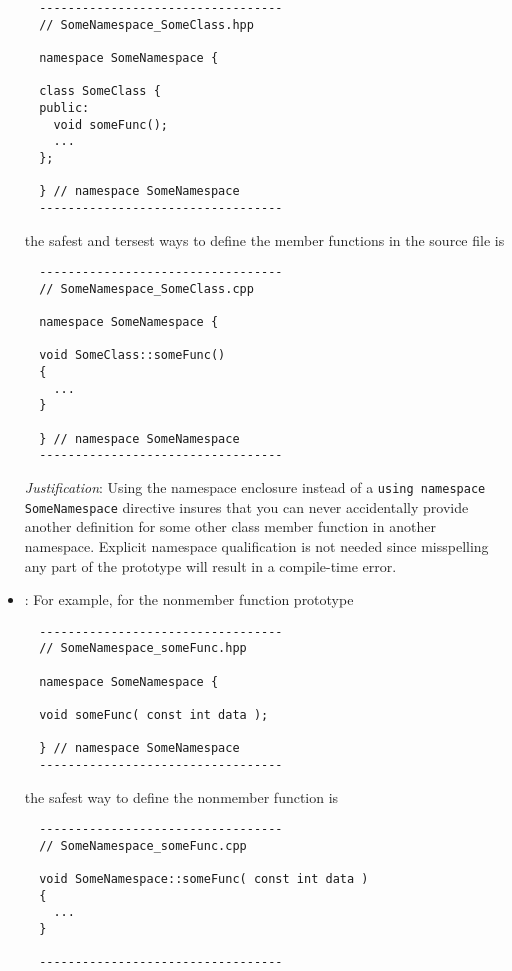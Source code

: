 \begin{itemize}
{\small\begin{verbatim}
  ----------------------------------
  // SomeNamespace_SomeClass.hpp

  namespace SomeNamespace {

  class SomeClass {
  public:
    void someFunc();
    ...
  };

  } // namespace SomeNamespace
  ----------------------------------
\end{verbatim}}

the safest and tersest ways to define the member functions in the
source file is

{\small\begin{verbatim}
  ----------------------------------
  // SomeNamespace_SomeClass.cpp

  namespace SomeNamespace {

  void SomeClass::someFunc()
  {
    ...
  }

  } // namespace SomeNamespace
  ----------------------------------
\end{verbatim}}

\textit{Justification}: Using the namespace enclosure instead of a
\texttt{using namespace SomeNamespace} directive insures that you can
never accidentally provide another definition for some other class
member function in another namespace.  Explicit namespace
qualification is not needed since misspelling any part of the
prototype will result in a compile-time error.


\item\GCGNamespaceFuncDefs: For example, for the nonmember function
  prototype

{\small\begin{verbatim}
  ----------------------------------
  // SomeNamespace_someFunc.hpp

  namespace SomeNamespace {

  void someFunc( const int data );

  } // namespace SomeNamespace
  ----------------------------------
\end{verbatim}}

the safest way to define the nonmember function is

{\small\begin{verbatim}
  ----------------------------------
  // SomeNamespace_someFunc.cpp

  void SomeNamespace::someFunc( const int data )
  {
    ...
  }

  ----------------------------------
\end{verbatim}}


\end{itemize}
